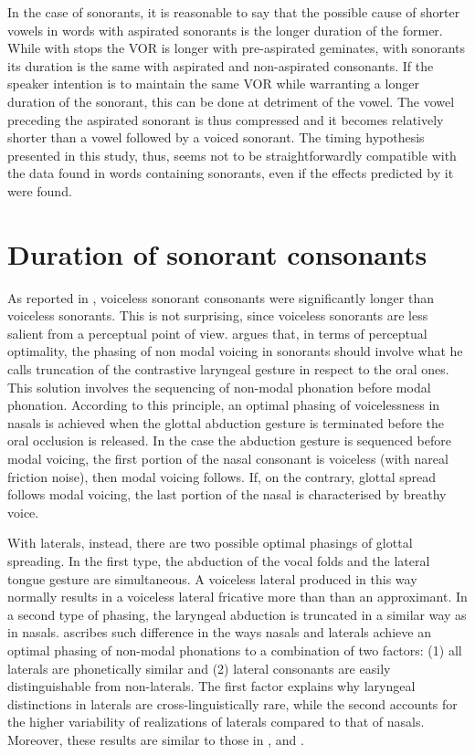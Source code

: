 \documentclass[11pt,a4paper,openany]{memoir}\usepackage[]{graphicx}\usepackage[]{color}
\begin{document}
In the case of sonorants, it is reasonable to say that the possible cause of shorter vowels in words with aspirated sonorants is the longer duration of the former.
While with stops the VOR is longer with pre-aspirated geminates, with sonorants its duration is the same with aspirated and non-aspirated consonants.
If the speaker intention is to maintain the same VOR while warranting a longer duration of the sonorant, this can be done at detriment of the vowel.
The vowel preceding the aspirated sonorant is thus compressed and it becomes relatively shorter than a vowel followed by a voiced sonorant.
The timing hypothesis presented in this study, thus, seems not to be straightforwardly compatible with the data found in words containing sonorants, even if the effects predicted by it were found.

\section{Duration of sonorant consonants}

As reported in , voiceless sonorant consonants were significantly longer than voiceless sonorants.
This is not surprising, since voiceless sonorants are less salient from a perceptual point of view.
\citet{silverman1997} argues that, in terms of perceptual optimality, the phasing of non modal voicing in sonorants should involve what he calls truncation of the contrastive laryngeal gesture in respect to the oral ones.
This solution involves the sequencing of non-modal phonation before modal phonation.
According to this principle, an optimal phasing of voicelessness in nasals is achieved when the glottal abduction gesture is terminated before the oral occlusion is released.
In the case the abduction gesture is sequenced before modal voicing, the first portion of the nasal consonant is voiceless (with nareal friction noise), then modal voicing follows.
If, on the contrary, glottal spread follows modal voicing, the last portion of the nasal is characterised by breathy voice.

With laterals, instead, there are two possible optimal phasings of glottal spreading.
In the first type, the abduction of the vocal folds and the lateral tongue gesture are simultaneous.
A voiceless lateral produced in this way normally results in a voiceless lateral fricative more than than an approximant.
In a second type of phasing, the laryngeal abduction is truncated in a similar way as in nasals.
\citet{silverman1997} ascribes such difference in the ways nasals and laterals achieve an optimal phasing of non-modal phonations to a combination of two factors: (1) all laterals are phonetically similar and (2) lateral consonants are easily distinguishable from non-laterals.
The first factor explains why laryngeal distinctions in laterals are cross-linguistically rare, while the second accounts for the higher variability of realizations of laterals compared to that of nasals.
Moreover, these results are similar to those in \citet{jessen1998}, \citet{bombien2006} and \citet{silverman2012}.
\end{document}
